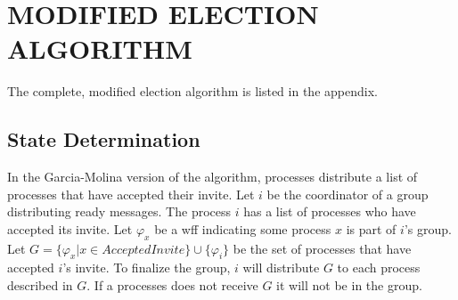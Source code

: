 \section{MODIFIED ELECTION ALGORITHM}

The complete, modified election algorithm is listed in the appendix.

\subsection{State Determination}

In the Garcia-Molina version of the algorithm, processes distribute a list of processes that have accepted their invite.
Let $i$ be the coordinator of a group distributing ready messages.
The process $i$ has a list of processes who have accepted its invite.
Let $\varphi_x$ be a wff indicating some process $x$ is part of $i$'s group.
Let $G = \{ \varphi_x | x \in AcceptedInvite \} \cup \{ \varphi_i \}$ be the set of processes that have accepted $i$'s invite.
To finalize the group, $i$ will distribute $G$ to each process described in $G$.
If a processes does not receive $G$ it will not be in the group.

